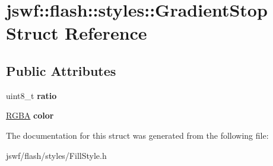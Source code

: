 \hypertarget{structjswf_1_1flash_1_1styles_1_1_gradient_stop}{\section{jswf\+:\+:flash\+:\+:styles\+:\+:Gradient\+Stop Struct Reference}
\label{structjswf_1_1flash_1_1styles_1_1_gradient_stop}
}
\subsection*{Public Attributes}
\begin{DoxyCompactItemize}
\item 
\hypertarget{structjswf_1_1flash_1_1styles_1_1_gradient_stop_ac2b03dd84d1a6514b218eff43705a0f9}{uint8\+\_\+t {\bfseries ratio}}\label{structjswf_1_1flash_1_1styles_1_1_gradient_stop_ac2b03dd84d1a6514b218eff43705a0f9}

\item 
\hypertarget{structjswf_1_1flash_1_1styles_1_1_gradient_stop_a64b9111ac28850afd2ce19d0bb5538ca}{\hyperlink{structjswf_1_1flash_1_1_r_g_b_a}{R\+G\+B\+A} {\bfseries color}}\label{structjswf_1_1flash_1_1styles_1_1_gradient_stop_a64b9111ac28850afd2ce19d0bb5538ca}

\end{DoxyCompactItemize}


The documentation for this struct was generated from the following file\+:\begin{DoxyCompactItemize}
\item 
jswf/flash/styles/Fill\+Style.\+h\end{DoxyCompactItemize}
